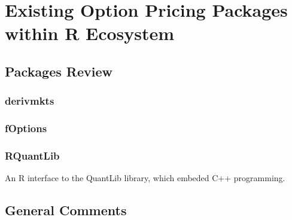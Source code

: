 \chapter{Existing Option Pricing Packages within R Ecosystem} \label{cpt:Existing Packages}

\section{Packages Review}

\subsection{derivmkts} \label{sub:derivmkts}

\subsection{fOptions} \label{sub:fOptions}

\subsection{RQuantLib} \label{sub:RQuantLib}

An R interface to the QuantLib library, which embeded C++ programming.

\section{General Comments}

